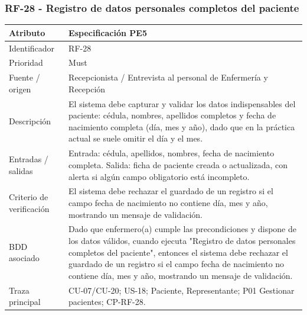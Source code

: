 \documentclass[11pt,a4paper]{article}
\begin{document}
	\subsubsection{RF-28 - Registro de datos personales completos del paciente}
	\begin{tabularx}{\textwidth}{p{3.2cm}Y}
		\toprule
		\textbf{Atributo} & \textbf{Especificación PE5}\\\midrule
		Identificador & RF-28\\
		Prioridad & Must\\
		Fuente / origen & Recepcionista / Entrevista al personal de Enfermería y Recepción\\
		Descripción & El sistema debe capturar y validar los datos indispensables del paciente: cédula, nombres, apellidos completos y fecha de nacimiento completa (día, mes y año), dado que en la práctica actual se suele omitir el día y el mes.\\
		Entradas / salidas & Entrada: cédula, apellidos, nombres, fecha de nacimiento completa. Salida: ficha de paciente creada o actualizada, con alerta si algún campo obligatorio está incompleto.\\
		Criterio de verificación & El sistema debe rechazar el guardado de un registro si el campo fecha de nacimiento no contiene día, mes y año, mostrando un mensaje de validación.\\
		BDD asociado & Dado que enfermero(a) cumple las precondiciones y dispone de los datos válidos, cuando ejecuta "Registro de datos personales completos del paciente", entonces el sistema debe rechazar el guardado de un registro si el campo fecha de nacimiento no contiene día, mes y año, mostrando un mensaje de validación.\\
		Traza principal & CU-07/CU-20; US-18; Paciente, Representante; P01 Gestionar pacientes; CP-RF-28.\\
		\bottomrule
	\end{tabularx}
	\clearpage
\end{document}
